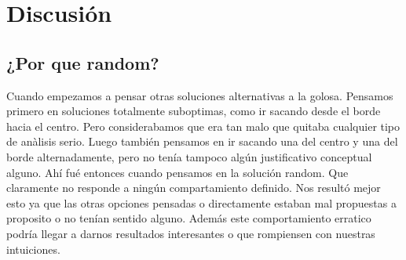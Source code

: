 \section{Discusi\'on}


\subsection{¿Por que random?}

Cuando empezamos a pensar otras soluciones alternativas a la golosa. Pensamos primero en soluciones totalmente suboptimas, como ir sacando desde el borde hacia el centro. Pero considerabamos que era tan malo que quitaba cualquier tipo de anàlisis serio. Luego también pensamos en ir sacando una del centro y una del borde alternadamente, pero no tenía tampoco algún justificativo conceptual alguno. Ahí fué entonces cuando pensamos en la solución random. Que claramente no responde a ningún compartamiento definido. Nos resultó mejor esto ya que las otras opciones pensadas o directamente estaban mal propuestas a proposito o no tenían sentido alguno. Además este comportamiento erratico podría llegar a darnos resultados interesantes o que rompiensen con nuestras intuiciones.








